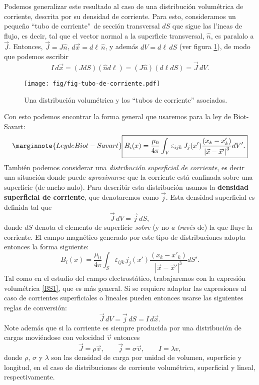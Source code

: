 Podemos generalizar este resultado al caso de una distribución volumétrica de corriente, descrita por su densidad de corriente. Para esto, consideramos un peque\~no ``tubo de corriente"\, de sección transversal $dS$ que sigue las l'ineas de flujo, es decir, tal que el vector normal a la superficie transversal, $\hat{n}$, es paralalo a $\vec{J}$. Entonces, $\vec{J}=J\hat{n}$, $d\vec{x}=d\ell\,\hat{n}$, y además $dV=d\ell\, dS$ (ver figura \ref{fig:tc}), de modo que podemos escribir
\begin{equation}
I\, d\vec{x}=(J dS)(\hat{n}d\ell)=(J\hat{n})(d\ell dS)=\vec{J}\,dV.
\end{equation}
\begin{figure}[!h]
\centerline{\texttt{[image: fig/fig-tubo-de-corriente.pdf]}}
\caption{Una distribución volumétrica y los ``tubos de corriente'' asociados.}
\label{fig:tc}
\end{figure}
Con esto podemos encontrar la forma general que usaremos para la ley de Biot-Savart:
\begin{equation}\marginnote{Ley de Biot-Savart}
 \boxed{B_i(x)=\frac{\mu_0}{4\pi}\int_V\varepsilon_{ijk}\,J_j(x')
\frac{\left(x_k-x'_k\right)}{\left\vert\vec{x}-\vec{x}'\right\vert^3}dV'. }
\label{BS2}
\end{equation}
También podemos considerar una \textit{distribución superficial de corriente}, es decir una situación donde puede \textit{aproximarse} que la corriente está confinada sobre una superficie (de ancho nulo). Para describir esta distribución usamos la \textbf{densidad superficial de corriente}, que denotaremos como $\vec{j}$. Esta densidad superficial es definida tal que
\begin{equation}
\vec{J}\,dV=\vec{j}\,dS,
\end{equation}
donde $dS$ denota el elemento de superficie \textit{sobre} (y no \textit{a través} de) la que fluye la corriente. El campo magnético generado por este tipo de distribuciones adopta entonces la forma siguiente:
\begin{equation}
 \boxed{B_i(x)=\frac{\mu_0}{4\pi}\int_S\varepsilon_{ijk}\,j_j(x')
\frac{\left(x_k-x'_k\right)}{\left\vert\vec{x}-\vec{x}'\right\vert^3}dS'. }
\label{BSsup}
\end{equation}
Tal como en el estudio del campo electrostático, trabajaremos con la expresión volumétrica \eqref{BS1}, que es más general. Si se requiere adaptar las expresiones al caso de corrientes superficiales o lineales pueden entonces usarse las siguientes reglas de conversión:
\begin{equation}\label{IdxJdV}
\vec{J}\,dV=\vec{j}\,dS=I\,d\vec{x}.
\end{equation}
Note además que si la corriente es siempre producida por una distribución de cargas moviéndose con velocidad $\vec{v}$ entonces 
\begin{equation}
\vec{J}=\rho\vec{v}, \qquad \vec{j}=\sigma\vec{v}, \qquad I=\lambda v,
\end{equation}
donde $\rho$, $\sigma$ y $\lambda$ son las densidad de carga por unidad de volumen, superficie y longitud, en el caso de distribuciones de corriente volumétrica, superficial y lineal, respectivamente.

